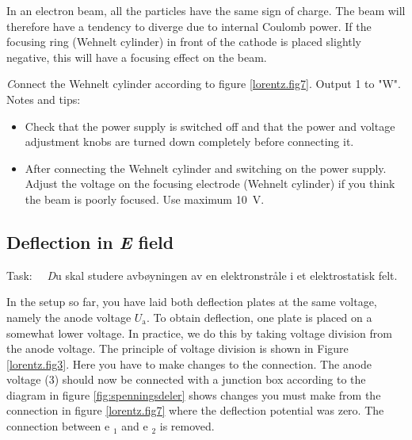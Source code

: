 \documentclass[../Elmag-labhefte-2020.tex]{subfiles}
\begin{document}
In an electron beam, all the particles have the same sign of charge. The beam will therefore have a tendency to diverge due to internal Coulomb power. If the focusing ring (Wehnelt cylinder) in front of the cathode is placed slightly negative, this will have a focusing effect on the beam.

{\emph Connect the Wehnelt cylinder according to figure \ref{lorentz.fig7}.}
Output 1 to "W".
Notes and tips:
\vspace{-4mm}
\begin{itemize}
    \item Check that the power supply is switched off and that the power and voltage adjustment knobs are turned down completely before connecting it.
    \item After connecting the Wehnelt cylinder and switching on the power supply. Adjust the voltage on the focusing electrode (Wehnelt cylinder) if you think the beam is poorly focused. Use maximum \SI{10}{\volt}.
\end{itemize}
\newpage

\subsection{Deflection in \textsl{E} field}

Task: \ \
{\emph Du skal studere avbøyningen av en elektronstråle i et elektrostatisk felt.}

In the setup so far, you have laid both deflection plates at the same voltage, namely the anode voltage $U_\mathrm{a}$. To obtain deflection, one plate is placed on a somewhat lower voltage. In practice, we do this by taking voltage division from the anode voltage. The principle of voltage division is shown in Figure \ref{lorentz.fig3}. Here you have to make changes to the connection. The anode voltage (3) should now be connected with a junction box according to the diagram in figure \ref{fig:spenningsdeler} shows changes you must make from the connection in figure \ref{lorentz.fig7} where the deflection potential was zero. The connection between e $_1$ and e $_2$ is removed.
\end{document}

